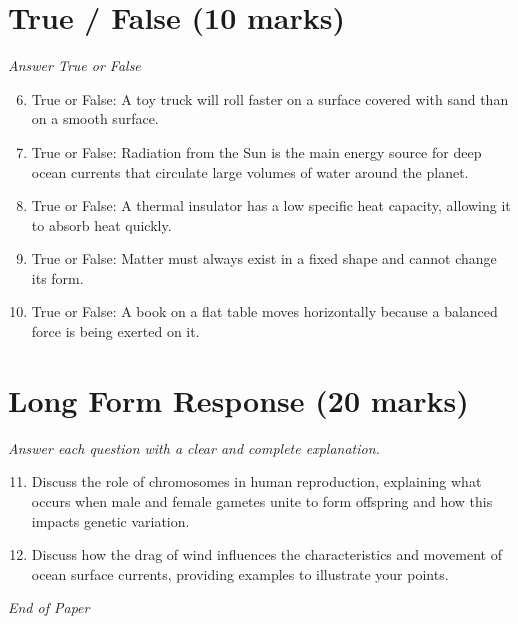 \documentclass[12pt]{article}
\begin{document}
\section*{True / False (10 marks)}
\textit{Answer True or False}
\begin{enumerate}[label=\arabic*.]
\setcounter{enumi}{5}
\item True or False: A toy truck will roll faster on a surface covered with sand than on a smooth surface.
\item True or False: Radiation from the Sun is the main energy source for deep ocean currents that circulate large volumes of water around the planet.
\item True or False: A thermal insulator has a low specific heat capacity, allowing it to absorb heat quickly.
\item True or False: Matter must always exist in a fixed shape and cannot change its form.
\item True or False: A book on a flat table moves horizontally because a balanced force is being exerted on it.
\end{enumerate}

\section*{Long Form Response (20 marks)}
\textit{Answer each question with a clear and complete explanation.}
\begin{enumerate}[label=\arabic*.]
\setcounter{enumi}{10}
\item Discuss the role of chromosomes in human reproduction, explaining what occurs when male and female gametes unite to form offspring and how this impacts genetic variation.
\item Discuss how the drag of wind influences the characteristics and movement of ocean surface currents, providing examples to illustrate your points.
\end{enumerate}

\vfill
\noindent\textit{End of Paper}
\end{document}
